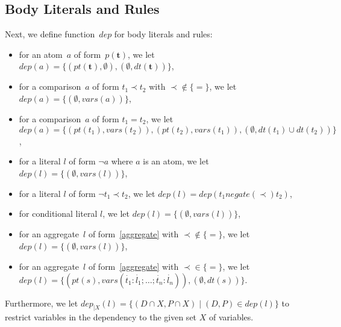 \documentclass{article}
\newcommand{\pool}[1]{\boldsymbol{#1}}
\newcommand{\tuple}[1]{\dot{#1}}
\newcommand{\set}[1]{\{#1\}}
\newcommand\Vars{\mathit{vars}}
\newcommand\Negate{\mathit{negate}}
\newcommand\Provide{\mathit{pt}}
\newcommand\Depend{\mathit{dt}}
\newcommand\ProDep{\mathit{dep}}
\begin{document}
	\subsection{Body Literals and Rules}
	Next, we define function~$\ProDep$ for body literals and rules:
	\begin{itemize}
		\item 
			for an atom~$a$ of form~$p(\pool{t})$, we let
			$\ProDep(a) = \set{(\Provide(\pool{t}), \emptyset), (\emptyset, \Depend(\pool{t}))}$,
		\item
			for a comparison~$a$ of form $t_1 \prec t_2$ with ${\prec} \notin \set{{=}}$, we let
			$\ProDep(a) = \set{(\emptyset, \Vars(a))}$,
		\item
			for a comparison~$a$ of form $t_1 = t_2$, we let
			$\ProDep(a) = \set{(\Provide(t_1), \Vars(t_2)), (\Provide(t_2), \Vars(t_1)), (\emptyset, \Depend(t_1) \cup \Depend(t_2))}$,
		\item 
			for a literal $l$ of form $\neg a$ where $a$ is an atom, we let
			$\ProDep(l) = \set{(\emptyset, \Vars(l))}$,
		\item 
			for a literal $l$ of form $\neg t_1 \prec t_2$, we let
			$\ProDep(l) = \ProDep(t_1 \mathrel{\Negate({\prec})} t_2)$,
		\item
			for conditional literal $l$, we let
			$\ProDep(l) = \set{(\emptyset, \Vars(l))}$,
		\item
			for an aggregate~$l$ of form~\eqref{aggregate} with ${\prec} \notin \set{{=}}$, we let
			$\ProDep(l) = \set{(\emptyset, \Vars(l))}$,
		\item
			for an aggregate~$l$ of form~\eqref{aggregate} with ${\prec} \in \set{{=}}$, we let
			$\ProDep(l) = \set{(\Provide(s), \Vars(\tuple{t_1} : \tuple{l_1}; \dots; \tuple{t_n} : \tuple{l_n})), (\emptyset,\Depend(s))}$.
	\end{itemize}
	Furthermore, we let $\ProDep_{|X}(l) = \set{(D \cap X, P \cap X) \mid (D, P) \in \ProDep(l)}$
	to restrict variables in the dependency to the given set $X$ of variables.
\end{document}
